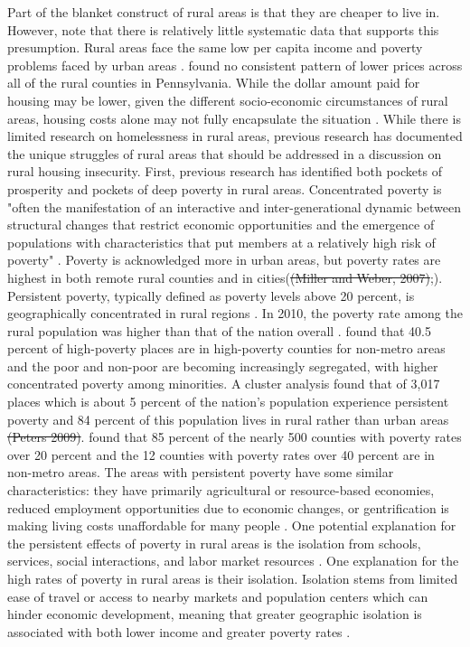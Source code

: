  Part of the blanket construct of rural areas is that they are cheaper to live in. However, \citep{kurre_is_2003} note that there is relatively little systematic data that supports this presumption. Rural areas face the same low per capita income and poverty problems faced by urban areas \citep{castle_place_2011}. \citep{zimmerman_does_2008} found no consistent pattern of lower prices across all of the rural counties in Pennsylvania. While the dollar amount paid for housing may be lower, given the different socio-economic circumstances of rural areas, housing costs alone may not fully encapsulate the situation \citep{kropczynski_insights_2012}.  While there is limited research on homelessness in rural areas, previous research has documented the unique struggles of rural areas that should be addressed in a discussion on rural housing insecurity. First, previous research has identified both pockets of prosperity and pockets of deep poverty in rural areas. Concentrated poverty is "often the manifestation of an interactive and inter-generational dynamic between structural changes that restrict economic opportunities and the emergence of populations with characteristics that put members at a relatively high risk of poverty" \citep[?]{thiede_spatial_2018}. Poverty is acknowledged more in urban areas, but poverty rates are highest in both remote rural counties and in cities(\sout{(Miller and Weber, 2007)};\citealp{crandall_local_2004}). Persistent poverty, typically defined as poverty levels above 20 percent, is geographically concentrated in rural regions \citep{crandall_local_2004}. In 2010, the poverty rate among the rural population was higher than that of the nation overall \citep{burton_inequality_2013}. \citet{lichter_rural_2011} found that 40.5 percent of high-poverty places are in high-poverty counties for non-metro areas and the poor and non-poor are becoming increasingly segregated, with higher concentrated poverty among minorities. A cluster analysis found that of 3,017 places which is about 5 percent of the nation's population experience persistent poverty and 84 percent of this population lives in rural rather than urban areas \sout{(Peters 2009)}. \citet{lichter_changing_2007} found that 85 percent of the nearly 500 counties with poverty rates over 20 percent and the 12 counties with poverty rates over 40 percent are in non-metro areas. The areas with persistent poverty have some similar characteristics: they have primarily agricultural or resource-based economies, reduced employment opportunities due to economic changes, or gentrification is making living costs unaffordable for many people \citep{robertson_rural_2007}. One potential explanation for the persistent effects of poverty in rural areas is the isolation from schools, services, social interactions, and labor market resources \citep{canto_rural_2014}. One explanation for the high rates of poverty in rural areas is their isolation. Isolation stems from limited ease of travel or access to nearby markets and population centers which can hinder economic development, meaning that greater geographic isolation is associated with both lower income and greater poverty rates \citep{blank_poverty_2005}. 
 
